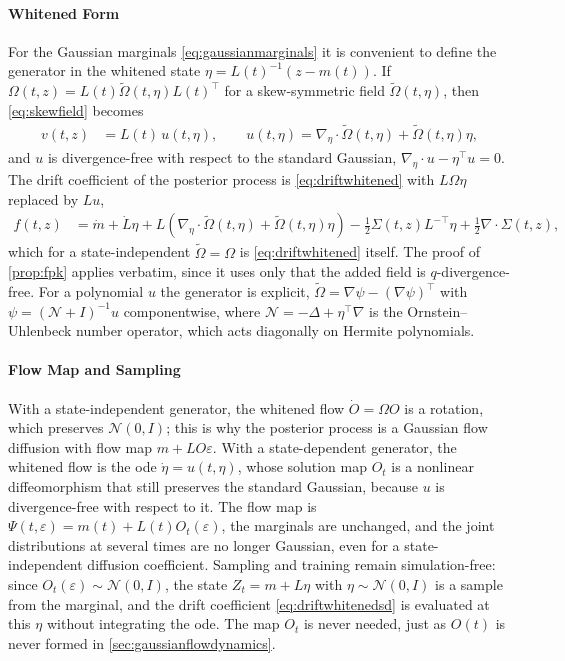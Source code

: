 \documentclass{article} %
\newcommand{\postdrift}{f}
\newcommand{\flow}{\Psi}
\newcommand{\gauge}{\Omega}
\newcommand{\Norm}{\mathcal{N}}
\begin{document}
\paragraph{Whitened Form}
For the Gaussian marginals \cref{eq:gaussianmarginals} it is convenient to define the generator in the whitened state $\eta = L(t)^{-1}(z - m(t))$. If $\gauge(t, z) = L(t) \tilde\gauge(t, \eta) L(t)^\top$ for a skew-symmetric field $\tilde\gauge(t, \eta)$, then \cref{eq:skewfield} becomes
\begin{align}
    v(t, z) &= L(t) \, u(t, \eta), \qquad u(t, \eta) = \nabla_\eta \cdot \tilde\gauge(t, \eta) + \tilde\gauge(t, \eta) \eta, \label{eq:whitenedskewfield}
\end{align}
and $u$ is divergence-free with respect to the standard Gaussian, $\nabla_\eta \cdot u - \eta^\top u = 0$. The drift coefficient of the posterior process is \cref{eq:driftwhitened} with $L \gauge \eta$ replaced by $L u$,
\begin{align}
    \postdrift(t, z) &= \dot m + \dot L \eta + L \left( \nabla_\eta \cdot \tilde\gauge(t, \eta) + \tilde\gauge(t, \eta) \eta \right) - \frac{1}{2} \Sigma(t, z) L^{-\top} \eta + \frac{1}{2} \nabla \cdot \Sigma(t, z), \label{eq:driftwhitenedsd}
\end{align}
which for a state-independent $\tilde\gauge = \gauge$ is \cref{eq:driftwhitened} itself. The proof of \cref{prop:fpk} applies verbatim, since it uses only that the added field is $q$-divergence-free. For a polynomial $u$ the generator is explicit, $\tilde\gauge = \nabla \psi - (\nabla \psi)^\top$ with $\psi = (\mathcal{N} + I)^{-1} u$ componentwise, where $\mathcal{N} = -\Delta + \eta^\top \nabla$ is the Ornstein--Uhlenbeck number operator, which acts diagonally on Hermite polynomials.

\paragraph{Flow Map and Sampling}
With a state-independent generator, the whitened flow $\dot O = \gauge O$ is a rotation, which preserves $\Norm(0, I)$; this is why the posterior process is a Gaussian flow diffusion with flow map $m + L O \varepsilon$. With a state-dependent generator, the whitened flow is the \gls{ode} $\dot \eta = u(t, \eta)$, whose solution map $O_t$ is a nonlinear diffeomorphism that still preserves the standard Gaussian, because $u$ is divergence-free with respect to it. The flow map is $\flow(t, \varepsilon) = m(t) + L(t) O_t(\varepsilon)$, the marginals are unchanged, and the joint distributions at several times are no longer Gaussian, even for a state-independent diffusion coefficient. Sampling and training remain simulation-free: since $O_t(\varepsilon) \sim \Norm(0, I)$, the state $Z_t = m + L \eta$ with $\eta \sim \Norm(0, I)$ is a sample from the marginal, and the drift coefficient \cref{eq:driftwhitenedsd} is evaluated at this $\eta$ without integrating the \gls{ode}. The map $O_t$ is never needed, just as $O(t)$ is never formed in \cref{sec:gaussianflowdynamics}.
\end{document}
